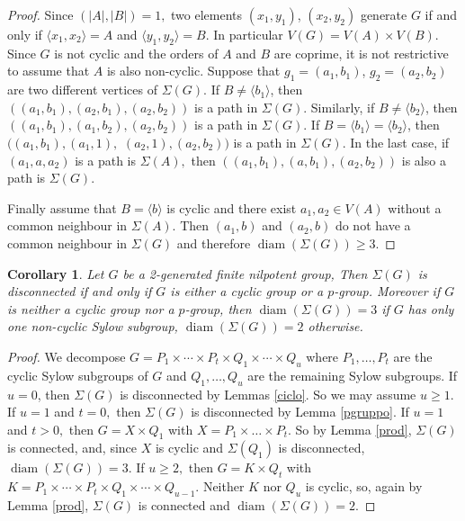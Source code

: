 \documentclass{amsart}
\DeclareMathOperator{\diam}{diam}
\newtheorem{cor}[thm]{Corollary}
\numberwithin{equation}{section}
\begin{document}
\begin{proof} Since $(|A|,|B|)=1,$ two elements $(x_1,y_1)$, $(x_2,y_2)$ generate $G$ if and only if $\langle x_1, x_2\rangle=A$
	and $\langle y_1, y_2\rangle=B$. In particular $V(G)=V(A)\times V(B).$ Since $G$ is not cyclic and the orders of $A$ and $B$ are coprime, it is not restrictive to assume that $A$ is also non-cyclic.
	Suppose that $g_1=(a_1,b_1)$, $g_2=(a_2,b_2)$ are two different vertices of $\Sigma(G).$ 
	If $B\neq \langle b_1 \rangle$, then $((a_1,b_1),(a_2,b_1),(a_2,b_2))$ is a path in $\Sigma(G).$ Similarly,
if	$B\neq \langle b_2 \rangle$, then $((a_1,b_1),(a_1,b_2),(a_2,b_2))$ is a path in $\Sigma(G).$
	If $B= \langle b_1 \rangle=\langle b_2 \rangle$, then $((a_1,b_1),(a_1,1),$ $(a_2,1),(a_2,b_2))$ is a path in $\Sigma(G)$. In the last case, if $(a_1,a,a_2)$ is a path is $\Sigma(A),$ then $((a_1,b_1), (a,b_1),
	(a_2,b_2))$ is also a path is $\Sigma(G).$
	
	
	
Finally assume that  $B=\langle b \rangle$ is cyclic and there exist $a_1, a_2 \in V(A)$ without a common neighbour in $\Sigma(A).$  Then $(a_1,b)$ and $(a_2,b)$ do not have a common neighbour in $\Sigma(G)$ and therefore $\diam(\Sigma(G))\geq 3.$
\end{proof}

\begin{cor}\label{nilpo}
	Let $G$ be a 2-generated finite nilpotent group, Then $\Sigma(G)$ is disconnected if and only if $G$ is either a cyclic group or a $p$-group.
	Moreover if $G$ is neither a cyclic group nor a $p$-group, then $\diam(\Sigma(G))=3$ if $G$ has only one non-cyclic Sylow subgroup, $\diam(\Sigma(G))=2$ otherwise.
\end{cor}
\begin{proof}
We decompose $G=P_1\times \cdots \times P_t\times Q_1\times \cdots \times Q_u$
where $P_1,\dots,P_t$ are the cyclic Sylow subgroups of $G$ and
$Q_1,\dots,Q_u$ are the remaining Sylow subgroups. If $u=0$, then 
$\Sigma(G)$ is disconnected by Lemmas \ref{ciclo}. So we may assume $u\geq 1$. If $u=1$ and $t=0,$ then $\Sigma(G)$ is disconnected by Lemma \ref{pgruppo}. If $u=1$ and $t>0,$ then $G=X \times Q_1$
with $X=P_1\times \dots \times P_t$. So by Lemma \ref{prod}, $\Sigma(G)$ is connected,
and, since $X$ is cyclic and $\Sigma(Q_1)$ is disconnected,  
 $\diam(\Sigma(G))=3.$
If $u\geq 2,$ then $G=K \times Q_t$ with
$K=P_1\times \cdots \times P_t\times Q_1\times \cdots \times Q_{u-1}.$ Neither $K$ nor $Q_u$ is cyclic, so, again by Lemma \ref{prod}, $\Sigma(G)$ is connected and $\diam(\Sigma(G))=2.$
\end{proof}
\end{document}
